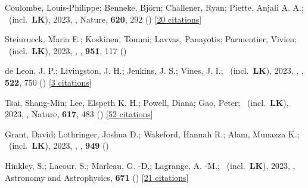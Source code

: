 \item[{\color{numcolor}\scriptsize91}] Coulombe, Louis-Philippe; Benneke, Bj{\"o}rn; Challener, Ryan; Piette, Anjali A. A.; \etal\ (incl.\ \textbf{LK}), 2023, , Nature, \textbf{620}, 292 () [\href{https://ui.adsabs.harvard.edu/abs/2023Natur.620..292C}{20 citations}]

\item[{\color{numcolor}\scriptsize90}] Steinrueck, Maria E.; Koskinen, Tommi; Lavvas, Panayotis; Parmentier, Vivien; \etal\ (incl.\ \textbf{LK}), 2023, , \apj, \textbf{951}, 117 ()

\item[{\color{numcolor}\scriptsize89}] de Leon, J. P.; Livingston, J. H.; Jenkins, J. S.; Vines, J. I.; \etal\ (incl.\ \textbf{LK}), 2023, , \mnras, \textbf{522}, 750 () [\href{https://ui.adsabs.harvard.edu/abs/2023MNRAS.522..750D}{3 citations}]

\item[{\color{numcolor}\scriptsize88}] Tsai, Shang-Min; Lee, Elspeth K. H.; Powell, Diana; Gao, Peter; \etal\ (incl.\ \textbf{LK}), 2023, , Nature, \textbf{617}, 483 () [\href{https://ui.adsabs.harvard.edu/abs/2023Natur.617..483T}{52 citations}]

\item[{\color{numcolor}\scriptsize87}] Grant, David; Lothringer, Joshua D.; Wakeford, Hannah R.; Alam, Munazza K.; \etal\ (incl.\ \textbf{LK}), 2023, , \apj, \textbf{949} ()

\item[{\color{numcolor}\scriptsize86}] Hinkley, S.; Lacour, S.; Marleau, G. -D.; Lagrange, A. -M.; \etal\ (incl.\ \textbf{LK}), 2023, , Astronomy and Astrophysics, \textbf{671} () [\href{https://ui.adsabs.harvard.edu/abs/2023A&A...671L...5H}{21 citations}]

